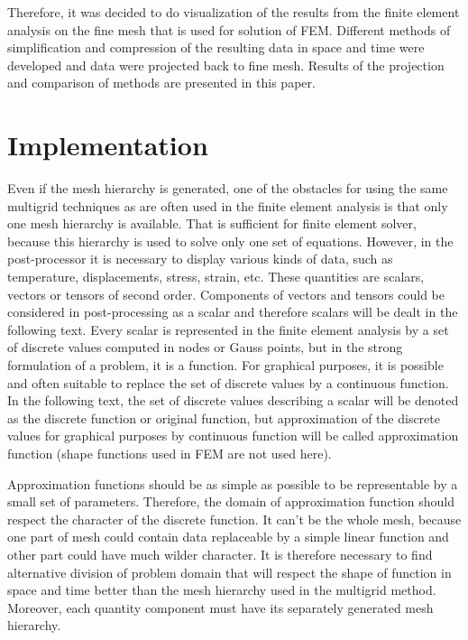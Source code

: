 Therefore, it was decided to do visualization of the results from the finite element analysis on the fine mesh that is used for solution of FEM. Different methods of simplification and compression of the resulting data in space and time were developed and data were projected back to fine mesh. Results of the projection and comparison of methods are presented in this paper.


\section{Implementation}

Even if the mesh hierarchy is generated, one of the obstacles for using the same multigrid techniques as are often used in the finite element analysis is that only one mesh hierarchy is available. That is sufficient for finite element solver, because this hierarchy is used to solve only one set of equations. However, in the post-processor it is necessary to display various kinds of data, such as temperature, displacements, stress, strain, etc. These quantities are scalars, vectors or tensors of second order. Components of vectors and tensors could be considered in post-processing as a scalar and therefore scalars will be dealt in the following text. Every scalar is represented in the finite element analysis by a set of discrete values computed in nodes or Gauss points, but in the strong formulation of a problem, it is a function. For graphical purposes, it is possible and often suitable to replace the set of discrete values by a continuous function. In the following text, the set of discrete values describing a scalar will be denoted as the discrete function or original function, but approximation of the discrete values for graphical purposes by continuous function will be called approximation function (shape functions used in FEM are not used here).

Approximation functions should be as simple as possible to be representable by a small set of parameters. Therefore, the domain of approximation function should respect the character of the discrete function. It can’t be the whole mesh, because one part of mesh could contain data replaceable by a simple linear function and other part could have much wilder character. It is therefore necessary to find alternative division of problem domain that will respect the shape of function in space and time better than the mesh hierarchy used in the multigrid method. Moreover, each quantity component must have its separately generated mesh hierarchy.


